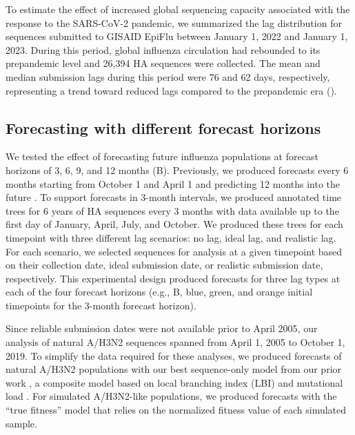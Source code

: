 \documentclass[9pt,lineno]{elife}
\begin{document}
To estimate the effect of increased global sequencing capacity associated with the response to the SARS-CoV-2 pandemic, we summarized the lag distribution for sequences submitted to GISAID EpiFlu between January 1, 2022 and January 1, 2023.
During this period, global influenza circulation had rebounded to its prepandemic level and 26,394 HA sequences were collected.
The mean and median submission lags during this period were 76 and 62 days, respectively, representing a trend toward reduced lags compared to the prepandemic era ().

\subsection{Forecasting with different forecast horizons}

We tested the effect of forecasting future influenza populations at forecast horizons of 3, 6, 9, and 12 months (B).
Previously, we produced forecasts every 6 months starting from October 1 and April 1 and predicting 12 months into the future \citep{Huddleston2020}.
To support forecasts in 3-month intervals, we produced annotated time trees for 6 years of HA sequences every 3 months with data available up to the first day of January, April, July, and October.
We produced these trees for each timepoint with three different lag scenarios: no lag, ideal lag, and realistic lag.
For each scenario, we selected sequences for analysis at a given timepoint based on their collection date, ideal submission date, or realistic submission date, respectively.
This experimental design produced forecasts for three lag types at each of the four forecast horizons (e.g., B, blue, green, and orange initial timepoints for the 3-month forecast horizon).

Since reliable submission dates were not available prior to April 2005, our analysis of natural A/H3N2 sequences spanned from April 1, 2005 to October 1, 2019.
To simplify the data required for these analyses, we produced forecasts of natural A/H3N2 populations with our best sequence-only model from our prior work \citep{Huddleston2020}, a composite model based on local branching index (LBI) \citep{Neher:2014eu} and mutational load \citep{Luksza:2014hj}.
For simulated A/H3N2-like populations, we produced forecasts with the ``true fitness'' model that relies on the normalized fitness value of each simulated sample.
\end{document}
